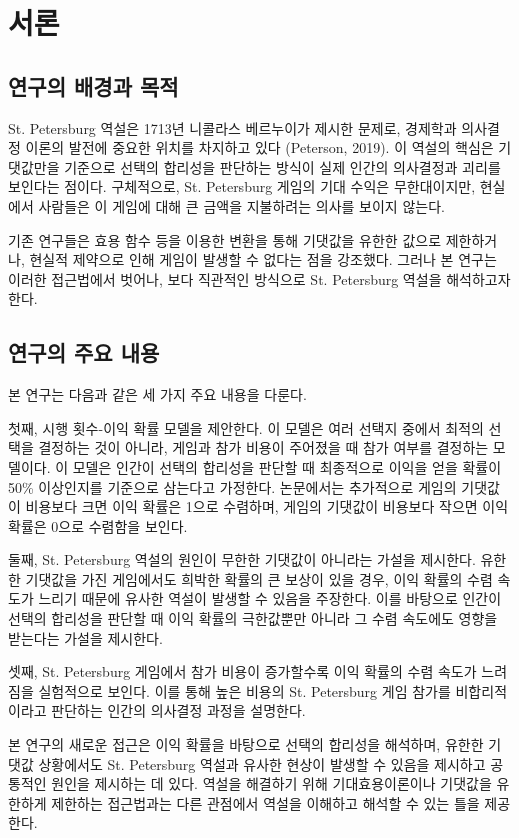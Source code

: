 \chapter{서론}

\section{연구의 배경과 목적}
St. Petersburg 역설은 1713년 니콜라스 베르누이가 제시한 문제로, 경제학과 의사결정 이론의 발전에 중요한 위치를 차지하고 있다 (Peterson, 2019). 이 역설의 핵심은 기댓값만을 기준으로 선택의 합리성을 판단하는 방식이 실제 인간의 의사결정과 괴리를 보인다는 점이다. 구체적으로, St. Petersburg 게임의 기대 수익은 무한대이지만, 현실에서 사람들은 이 게임에 대해 큰 금액을 지불하려는 의사를 보이지 않는다.

기존 연구들은 효용 함수 등을 이용한 변환을 통해 기댓값을 유한한 값으로 제한하거나, 현실적 제약으로 인해 게임이 발생할 수 없다는 점을 강조했다. 그러나 본 연구는 이러한 접근법에서 벗어나, 보다 직관적인 방식으로 St. Petersburg 역설을 해석하고자 한다.

\section{연구의 주요 내용}
본 연구는 다음과 같은 세 가지 주요 내용을 다룬다.

첫째, 시행 횟수-이익 확률 모델을 제안한다. 이 모델은 여러 선택지 중에서 최적의 선택을 결정하는 것이 아니라, 게임과 참가 비용이 주어졌을 때 참가 여부를 결정하는 모델이다. 이 모델은 인간이 선택의 합리성을 판단할 때 최종적으로 이익을 얻을 확률이 50\% 이상인지를 기준으로 삼는다고 가정한다. 논문에서는 추가적으로 게임의 기댓값이 비용보다 크면 이익 확률은 1으로 수렴하며, 게임의 기댓값이 비용보다 작으면 이익 확률은 0으로 수렴함을 보인다.

둘째, St. Petersburg 역설의 원인이 무한한 기댓값이 아니라는 가설을 제시한다. 유한한 기댓값을 가진 게임에서도 희박한 확률의 큰 보상이 있을 경우, 이익 확률의 수렴 속도가 느리기 때문에 유사한 역설이 발생할 수 있음을 주장한다. 이를 바탕으로 인간이 선택의 합리성을 판단할 때 이익 확률의 극한값뿐만 아니라 그 수렴 속도에도 영향을 받는다는 가설을 제시한다.

셋째, St. Petersburg 게임에서 참가 비용이 증가할수록 이익 확률의 수렴 속도가 느려짐을 실험적으로 보인다. 이를 통해 높은 비용의 St. Petersburg 게임 참가를 비합리적이라고 판단하는 인간의 의사결정 과정을 설명한다.

본 연구의 새로운 접근은 이익 확률을 바탕으로 선택의 합리성을 해석하며, 유한한 기댓값 상황에서도 St. Petersburg 역설과 유사한 현상이 발생할 수 있음을 제시하고 공통적인 원인을 제시하는 데 있다. 역설을 해결하기 위해 기대효용이론이나 기댓값을 유한하게 제한하는 접근법과는 다른 관점에서 역설을 이해하고 해석할 수 있는 틀을 제공한다.
